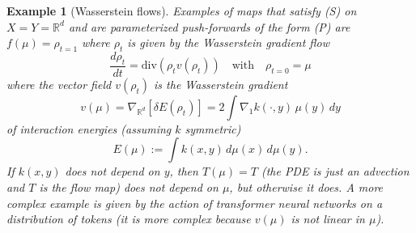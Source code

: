 \documentclass{article}
\newtheorem{example}{Example}
\begin{document}
\begin{example}[Wasserstein flows]\label{ex:flows}
Examples of maps that satisfy (S) on \( X = Y = \mathbb{R}^d \) and are parameterized push-forwards of the form (P) are \( f(\mu) = \rho_{t=1} \) where \( \rho_t \) is given by the Wasserstein gradient flow
\[
\frac{d \rho_t}{dt} = \text{div} \left( \rho_t v(\rho_t) \right) \quad \text{with} \quad \rho_{t=0} = \mu
\]
where the vector field \( v(\rho_t) \) is the Wasserstein gradient 
\[
v(\mu) = \nabla_{\mathbb{R}^d} \left[ \delta E(\rho_t) \right] = 2 \int \nabla_1 k(\cdot,y) \, \mu(y) \, dy
\]
of interaction energies (assuming \( k \) symmetric)
\[
E(\mu) := \int k(x,y) \, d\mu(x) \, d\mu(y).
\]
If \( k(x,y) \) does not depend on \( y \), then \( T(\mu) = T \) (the PDE is just an advection and \( T \) is the flow map) does not depend on \( \mu \), but otherwise it does. A more complex example is given by the action of transformer neural networks on a distribution of tokens (it is more complex because \( v(\mu) \) is not linear in \( \mu \)).
\end{example}
\end{document}
